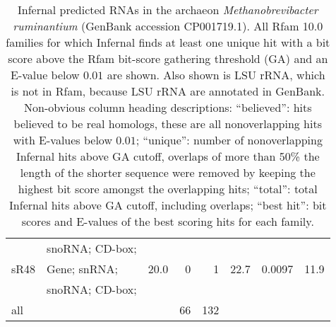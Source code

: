 \begin{small}
\begin{table}
\begin{center}
\begin{tabular}{|l|l|r|r|r|rr|r|}
                                &  snoRNA; CD-box;       &        &        &        &         &          &       \\
sR48                            &  Gene; snRNA;          &  20.0  &     0  &      1 &   22.7  &   0.0097 &  11.9 \\
                                &  snoRNA; CD-box;       &        &        &        &         &          &       \\
all                             &                        &        &    66  &    132 &         &          &       \\ \hline
\end{tabular}
\caption{Infernal predicted RNAs in the archaeon
  \emph{Methanobrevibacter ruminantium} (GenBank accession
  CP001719.1). All Rfam 10.0 families \cite{Gardner11} for which
  Infernal finds at least one unique hit with a bit score above the
  Rfam bit-score gathering threshold (GA) and an E-value below $0.01$ are
  shown. Also shown is LSU rRNA, which is not in Rfam, because LSU
  rRNA are annotated in GenBank. 
  Non-obvious column heading descriptions:
  ``believed'': hits believed to be real homologs, these are all
  nonoverlapping hits with E-values below $0.01$; ``unique'': number
  of nonoverlapping Infernal hits above GA cutoff, overlaps of more
  than 50\% the length of the shorter sequence were removed by keeping
  the highest bit score amongst the overlapping hits; ``total'': total
  Infernal hits above GA cutoff, including overlaps; ``best hit'': bit
  scores and E-values of the best scoring hits for each family.}
\end{center}
\end{table}
\end{small}
